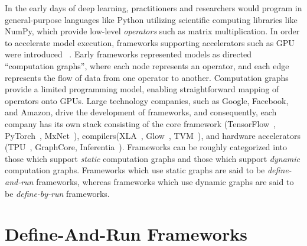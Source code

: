 In the early days of deep learning, practitioners and researchers would program
  in general-purpose languages like Python utilizing
  scientific computing libraries like NumPy,
  which provide low-level \textit{operators} such as matrix multiplication.
In order to accelerate model execution,
    frameworks supporting accelerators such as GPU were introduced~\citep{theano} .
Early frameworks represented models as directed ``computation graphs'',
    where each node represents an operator,
    and each edge represents the flow of data from one operator to another.
Computation graphs provide a limited programming model,
    enabling straightforward mapping of operators onto GPUs.
Large technology companies,
    such as Google, Facebook, and Amazon,
    drive the development of frameworks,
    and consequently,
    each company has its own stack consisting
    of the core framework (TensorFlow~\citep{tensorflow}, PyTorch~\citep{pytorch}, MxNet~\citep{mxnet}),
    compilers(XLA~\citep{xla}, Glow~\citep{glow}, TVM~\citep{tvm_osdi18}),
    and hardware accelerators (TPU~\citep{tpuv1}, GraphCore, Inferentia~\citep{inferentia}).
Frameworks can be roughly categorized into those which support \textit{static} computation graphs
  and those which support \textit{dynamic} computation graphs.
Frameworks which use static graphs are said to be \textit{define-and-run} frameworks,
  whereas frameworks which use dynamic graphs are said to be \textit{define-by-run} frameworks.

\section{Define-And-Run Frameworks}

